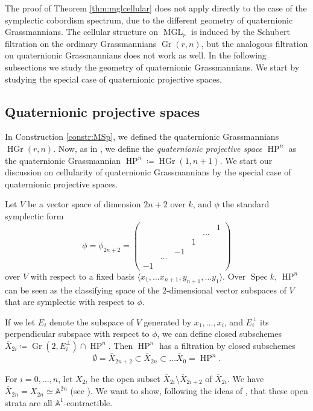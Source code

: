 \documentclass[10pt]{amsart}
\theoremstyle{definition}
\theoremstyle{plain}
\numberwithin{equation}{section}
\newcommand{\0}{\emptyset}
\newcommand{\MGL}{{\operatorname{MGL}}}
\newcommand{\Gr}{{\operatorname{Gr}}}
\newcommand{\HGr}{{\operatorname{HGr}}}
\newcommand{\HP}{{\operatorname{HP}}}
\newcommand{\Spec}{{\operatorname{Spec}}}
\begin{document}
The proof of Theorem \ref{thm:mglcellular} does not apply directly to the case of the symplectic cobordism spectrum, due to the different geometry of quaternionic Grassmannians. The cellular structure on $\MGL_r$ is induced by the Schubert filtration on the ordinary Grassmannians $\Gr(r,n)$, but the analogous filtration on quaternionic Grassmannians does not work as well. In the following subsections we study the geometry of quaternionic Grassmannians. We start by studying the special case of quaternionic projective spaces.

\subsection{Quaternionic projective spaces}

In Construction \ref{constr:MSp}, we defined the quaternionic Grassmannians $\HGr(r,n)$. Now, as in \cite{panwal:grass}, we define the \emph{quaternionic projective space} $\HP^n$ as the quaternionic Grassmannian $\HP^n \coloneqq \HGr(1,n+1)$. We start our discussion on cellularity of quaternionic Grassmannians by the special case of quaternionic projective spaces.

Let $V$ be a vector space of dimension $2n+2$ over $k$, and $\phi$ the standard symplectic form
$$\phi = \phi_{2n+2} =
\begin{pmatrix}
     & & &  &  & 1\\
     & &  &  &\ldots & \\
     & & & 1& &\\
     & & -1 &  & &  \\
     & \ldots &  & & & \\
     -1 & & & & &
\end{pmatrix}$$
over $V$ with respect to a fixed basis $\langle x_1, \ldots x_{n+1}, y_{n+1}, \ldots y_1 \rangle$. Over $\Spec k$, $\HP^n$ can be seen as the classifying space of the $2$-dimensional vector subspaces of $V$ that are symplectic with respect to $\phi$. 

If we let $E_i$ denote the subspace of $V$ generated by $x_1, \ldots, x_i$, and $E_i^{\perp}$ its perpendicular subspace with respect to $\phi$, we can define closed subschemes $\overline{X}_{2i}\coloneqq \Gr(2,E_i^{\perp}) \cap \HP^n$. Then $\HP^n$ has a filtration by closed subschemes
$$ \emptyset = \overline{X}_{2n+2} \subset \overline{X}_{2n} \subset \ldots \overline{X}_0=\HP^n.$$

For $i=0,\ldots, n$, let $X_{2i}$ be the open subset $\overline{X}_{2i}\setminus \overline{X}_{2i +2}$ of $\overline{X}_{2i}$. We have $\overline{X}_{2n}=X_{2n} \simeq \mathbb{A}^{2n}$ (see \cite[Corollary 3.3]{panwal:grass}). We want to show, following the ideas of \cite{panwal:grass}, that these open strata are all $\mathbb{A}^1$-contractible.
\end{document}
